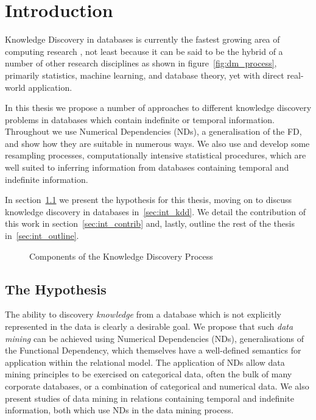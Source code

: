 \chapter{Introduction}\label{chap:intro}

Knowledge Discovery in databases is currently the fastest
growing area of computing research \cite{knowdisc91}, not least because it can be said
to be the hybrid of a number of other research disciplines as shown in
figure~\ref{fig:dm_process}, primarily statistics, machine learning,
and database theory, yet with direct real-world application.

\medskip

In this thesis we propose a number of approaches to different
knowledge discovery
problems in databases which contain indefinite or temporal
information. Throughout we use Numerical Dependencies (NDs), a
generalisation of the FD, and 
show how they are suitable in numerous ways.  We also use and develop some
resampling processes, computationally intensive statistical
procedures, which are well suited to inferring information from
databases containing temporal and indefinite information. 

In section~\ref{sec:int_hyp} we present the hypothesis for this
thesis, moving on to discuss knowledge discovery in databases
in~\ref{sec:int_kdd}. We detail the contribution of this work in
section~\ref{sec:int_contrib} and, lastly, outline the rest of the
thesis in~\ref{sec:int_outline}.

\begin{figure}
\centerline{}
\caption{\label{fig:kdd_component}Components of the
         Knowledge Discovery Process}
\end{figure}

\section{The Hypothesis}\label{sec:int_hyp}

The ability to discovery {\em knowledge} from a database which is not
explicitly represented in the data is clearly a desirable goal. We
propose that such {\em data mining} can be achieved using Numerical
Dependencies (NDs), generalisations of the Functional Dependency,
which themselves have a well-defined semantics for application within
the relational model. The application of NDs allow data
mining principles to be exercised on categorical data, often the bulk
of many corporate databases, or a combination of categorical and
numerical data. We also present studies of data mining in
relations containing temporal and indefinite information, both which
use NDs in the data mining process.

